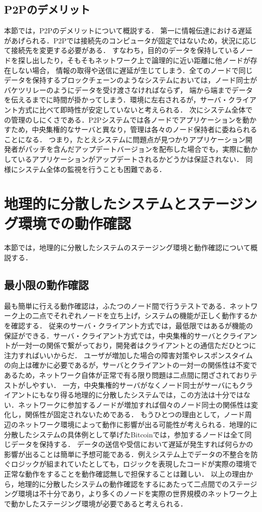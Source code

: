 \subsection{P2Pのデメリット}
本節では，P2Pのデメリットについて概説する．
第一に情報伝達における遅延があげられる．P2Pでは接続先のコンピュータが固定ではないため，状況に応じて接続先を変更する必要がある．
すなわち，目的のデータを保持しているノードを探し出したり，そもそもネットワーク上で論理的に近い距離に他ノードが存在しない場合，
情報の取得や送信に遅延が生じてしまう．全てのノードで同じデータを保持するブロックチェーンのようなシステムにおいては，ノード同士がバケツリレーのようにデータを受け渡さなければならず，
端から端までデータを伝えるまでに時間が掛かってしまう．環境に左右されるが，サーバ・クライアント方式に比べて即時性が安定していないと考えられる．
次にシステム全体での管理のしにくさである．P2Pシステムでは各ノードでアプリケーションを動かすため，中央集権的なサーバと異なり，管理は各々のノード保持者に委ねられることになる．
つまり，たとえシステムに問題点が見つかりアプリケーション開発者がパッチを含んだアップデートバージョンを配布した場合でも，実際に動かしているアプリケーションがアップデートされるかどうかは保証されない．
同様にシステム全体の監視を行うことも困難である．

\section{地理的に分散したシステムとステージング環境での動作確認}
\label{background:staging-environment}
本節では，地理的に分散したシステムのステージング環境と動作確認について概説する．

\subsection{最小限の動作確認}
最も簡単に行える動作確認は，ふたつのノード間で行うテストである．ネットワーク上の二点でそれぞれノードを立ち上げ，システムの機能が正しく動作するかを確認する．
従来のサーバ・クライアント方式では，最低限ではあるが機能の保証ができる．サーバ・クライアント方式では，中央集権的サーバとクライアントが一対一の関係で繋がっており，開発者はクライアントとの通信ただひとつに注力すればいいからだ．
ユーザが増加した場合の障害対策やレスポンスタイムの向上は確かに必要であるが，サーバとクライアントの一対一の関係性は不変であるため，ネットワーク自体が正常で有る限り問題は二点間に閉ざされておりテストがしやすい．
一方，中央集権的サーバがなくノード同士がサーバにもクライアントにもなり得る地理的に分散したシステムでは，この方法は十分ではない．ネットワークに参加するノードが増加すれば個々のノード同士の関係性は変化し，関係性が固定されないためである．
もうひとつの理由として，ノード周辺のネットワーク環境によって動作に影響が出る可能性が考えられる．地理的に分散したシステムの具体例として挙げたBitcoinでは，参加するノードは全て同じデータを保持する．
データの送信や受信において遅延が発生すれば何らかの影響が出ることは簡単に予想可能である．例えシステム上でデータの不整合を防ぐロジックが組まれていたとしても，ロジックを表現したコードが実際の環境で正常な動作をすることを動作確認無しで担保することは難しい．
以上の理由から，地理的に分散したシステムの動作確認をするにあたって二点間でのステージング環境は不十分であり，より多くのノードを実際の世界規模のネットワーク上で動かしたステージング環境が必要であると考えられる．

